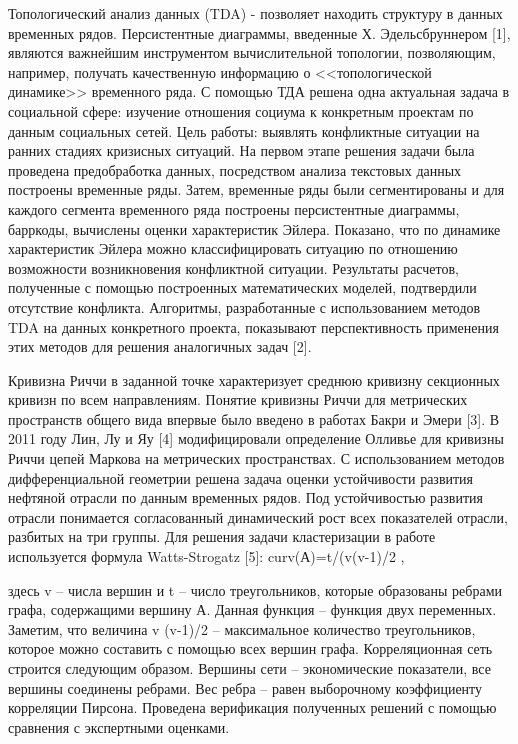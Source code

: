 Топологический анализ данных (TDA) - позволяет находить структуру в данных временных рядов. Персистентные диаграммы, введенные Х. Эдельсбруннером [1], являются важнейшим инструментом вычислительной топологии, позволяющим, например, получать качественную информацию о <<топологической динамике>> временного ряда.   С помощью ТДА решена одна актуальная задача в социальной сфере: изучение отношения социума к конкретным проектам по данным социальных сетей. Цель работы: выявлять конфликтные ситуации на ранних стадиях кризисных ситуаций.  На первом этапе решения задачи была проведена предобработка данных, посредством анализа текстовых данных построены временные ряды. Затем, временные ряды были сегментированы и для каждого сегмента временного ряда построены персистентные диаграммы,  барркоды, вычислены оценки характеристик Эйлера. Показано, что по динамике характеристик Эйлера можно классифицировать ситуацию по отношению возможности возникновения  конфликтной ситуации. Результаты расчетов, полученные с помощью построенных математических моделей, подтвердили отсутствие конфликта. Алгоритмы, разработанные с использованием методов TDA на данных конкретного проекта, показывают перспективность применения этих методов для решения аналогичных задач [2].

Кривизна Риччи в заданной точке характеризует среднюю кривизну секционных кривизн по всем направлениям. Понятие кривизны Риччи для метрических пространств общего вида впервые было введено в работах Бакри и Эмери [3]. В 2011 году Лин, Лу и Яу [4] модифицировали определение Олливье для кривизны Риччи цепей Маркова на метрических пространствах.
С использованием методов дифференциальной геометрии решена задача оценки устойчивости развития нефтяной отрасли по данным временных рядов. Под устойчивостью развития отрасли понимается согласованный динамический рост всех показателей отрасли, разбитых на три группы.
Для решения задачи кластеризации в работе используется формула Watts-Strogatz [5]:
curv(А)=t/(v(v-1)/2 ,

здесь v -- числа вершин и t -- число треугольников, которые образованы ребрами графа, содержащими вершину А. Данная функция -- функция двух переменных. Заметим, что величина v (v-1)/2 -- максимальное количество треугольников, которое можно составить с помощью всех вершин графа.
Корреляционная сеть строится следующим образом. Вершины сети -- экономические показатели, все вершины соединены ребрами. Вес ребра -- равен выборочному коэффициенту корреляции Пирсона. Проведена верификация полученных решений с помощью сравнения с экспертными оценками.

